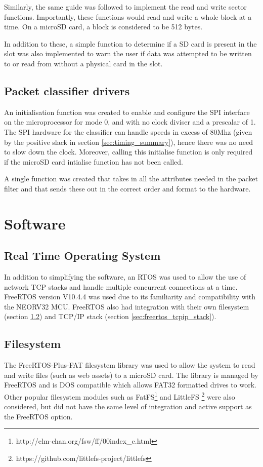 Similarly, the same guide was followed to implement the read and write sector functions. Importantly, these functions would read and write a whole block at a time. On a microSD card, a block is considered to be 512 bytes. 


In addition to these, a simple function to determine if a SD card is present in the slot was also implemented to warn the user if data was attempted to be written to or read from without a physical card in the slot. 





\subsection{Packet classifier drivers}
\label{sec:packet_filter_driver}
An initialisation function was created to enable and configure the SPI interface on the microprocessor for mode 0, and with no clock diviser and a prescalar of 1. The SPI hardware for the classifier can handle speeds in excess of 80Mhz (given by the positive slack in section \ref{sec:timing_summary}), hence there was no need to slow down the clock. Moreover, calling this initialise function is only required if the microSD card intialise function has not been called. 

A single function was created that takes in all the attributes needed in the packet filter and that sends these out in the correct order and format to the hardware. 








\section{Software}

\subsection{Real Time Operating System}
In addition to simplifying the software, an RTOS was used to allow the use of network TCP stacks and handle multiple concurrent connections at a time. FreeRTOS version V10.4.4 was used due to its familiarity and compatibility with the NEORV32 MCU. FreeRTOS also had integration with their own filesystem (section \ref{sec:freertos_filesystem}) and TCP/IP stack (section \ref{sec:freertos_tcpip_stack}).

\subsection{Filesystem}
\label{sec:freertos_filesystem}
The FreeRTOS-Plus-FAT filesystem library was used to allow the system to read and write files (such as web assets) to a microSD card. The library is managed by FreeRTOS and is DOS compatible which allows FAT32 formatted drives to work. Other popular filesystem modules such as FatFS\footnote[1]{http://elm-chan.org/fsw/ff/00index\_e.html} and LittleFS \footnote[2]{https://github.com/littlefs-project/littlefs} were also considered, but did not have the same level of integration and active support as the FreeRTOS option. 

